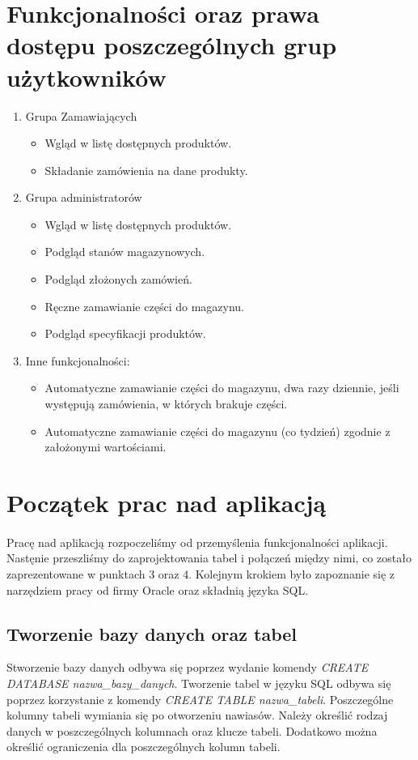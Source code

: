 \documentclass{article}
\begin{document}
\section{Funkcjonalności oraz prawa dostępu poszczególnych grup użytkowników}
\begin{enumerate}
   \item Grupa Zamawiających
         \begin{itemize}
            \item Wgląd w listę dostępnych produktów.
            \item Składanie zamówienia na dane produkty.
         \end{itemize}
   \item Grupa administratorów
         \begin{itemize}
            \item Wgląd w listę dostępnych produktów.
            \item Podgląd stanów magazynowych.
            \item Podgląd złożonych zamówień.
            \item Ręczne zamawianie części do magazynu.
            \item Podgląd specyfikacji produktów.
         \end{itemize}
   \item Inne funkcjonalności:
         \begin{itemize}
            \item Automatyczne zamawianie części do magazynu, dwa razy dziennie, jeśli występują
                  zamówienia, w których brakuje części.
            \item Automatyczne zamawianie części do magazynu (co tydzień) zgodnie z założonymi wartościami.     \end{itemize}
\end{enumerate}
\newpage
\section{Początek prac nad aplikacją}
\paragraph{}
Pracę nad aplikacją rozpoczeliśmy od przemyślenia funkcjonalności aplikacji.
Nastęnie przeszliśmy do zaprojektowania tabel i połączeń między
nimi, co zostało zaprezentowane w punktach 3 oraz 4. Kolejnym krokiem było
zapoznanie się z narzędziem pracy od firmy Oracle oraz składnią języka SQL.
\subsection{Tworzenie bazy danych oraz tabel}
Stworzenie bazy danych odbywa się poprzez wydanie komendy \textit{CREATE
   DATABASE nazwa\_bazy\_danych}. Tworzenie tabel w języku SQL odbywa się poprzez korzystanie z komendy
\textit{CREATE TABLE nazwa\_tabeli}. Poszczególne kolumny tabeli wymiania się po
otworzeniu nawiasów. Należy określić rodzaj danych w poszczególnych kolumnach
oraz klucze tabeli. Dodatkowo można określić ograniczenia dla poszczególnych
kolumn tabeli.
\end{document}
